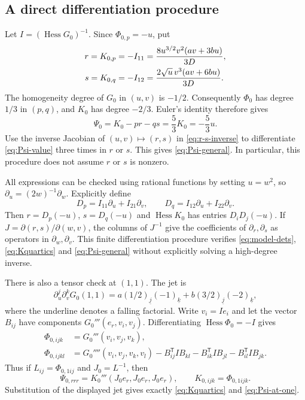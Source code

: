 \documentclass[11pt,a4paper]{article}
\numberwithin{equation}{section}
\theoremstyle{remark}
\DeclareMathOperator{\Hess}{Hess}
\begin{document}
\subsection{A direct differentiation procedure}
Let $I=(\Hess G_0)^{-1}$. Since $\Phi_{0,p}=-u$, put
\begin{align}
 r=K_{0,p}=-I_{11}
   &=\frac{8u^{3/2}v^2(av+3bu)}{3D},\notag\\
 s=K_{0,q}=-I_{12}
   &=\frac{2\sqrt u\,v^3(av+6bu)}{3D}.
                  \label{eq:r-s-inverse}
\end{align}
The homogeneity degree of $G_0$ in $(u,v)$ is $-1/2$. Consequently
$\Phi_0$ has degree $1/3$ in $(p,q)$, and $K_0$ has degree $-2/3$.
Euler's identity therefore gives
\begin{equation}\label{eq:Psi-value}
 \Psi_0=K_0-pr-qs=\frac53 K_0=-\frac53u.
\end{equation}
Use the inverse Jacobian of $(u,v)\mapsto(r,s)$ in
\eqref{eq:r-s-inverse} to differentiate \eqref{eq:Psi-value} three times
in $r$ or $s$. This gives \eqref{eq:Psi-general}. In particular, this
procedure does not assume $r$ or $s$ is nonzero.

All expressions can be checked using rational functions by setting
$u=w^2$, so $\partial_u=(2w)^{-1}\partial_w$. Explicitly define
\[
 D_p=I_{11}\partial_u+I_{21}\partial_v,\qquad
 D_q=I_{12}\partial_u+I_{22}\partial_v.
\]
Then $r=D_p(-u)$, $s=D_q(-u)$ and
$\Hess K_0$ has entries $D_iD_j(-u)$. If
$J=\partial(r,s)/\partial(w,v)$, the columns of $J^{-1}$ give the
coefficients of $\partial_r,\partial_s$ as operators in
$\partial_w,\partial_v$. This finite differentiation procedure verifies
\eqref{eq:model-dets}, \eqref{eq:Kquartics} and
\eqref{eq:Psi-general} without explicitly solving a high-degree inverse.

There is also a tensor check at $(1,1)$. The jet is
\[
 \partial_u^j\partial_v^kG_0(1,1)
   =a(1/2)_{\underline j}(-1)_{\underline k}
       +b(3/2)_{\underline j}(-2)_{\underline k},
\]
where the underline denotes a falling factorial. Write $v_i=Ie_i$ and
let the vector $B_{ij}$ have components $G_0'''(e_r,v_i,v_j)$. Differentiating
$\Hess\Phi_0=-I$ gives
\begin{align*}
 \Phi_{0,ijk}&=G_0'''(v_i,v_j,v_k),\\
 \Phi_{0,ijkl}&=G_0''''(v_i,v_j,v_k,v_l)
       -B_{ij}^{\mathsf T}IB_{kl}-B_{ik}^{\mathsf T}IB_{jl}
       -B_{il}^{\mathsf T}IB_{jk}.
\end{align*}
Thus if $L_{ij}=\Phi_{0,1ij}$ and $J_0=L^{-1}$, then
\[
 \Psi_{0,rrr}=K_0'''(J_0e_r,J_0e_r,J_0e_r),
 \qquad K_{0,ijk}=\Phi_{0,1ijk}.
\]
Substitution of the displayed jet gives exactly
\eqref{eq:Kquartics} and \eqref{eq:Psi-at-one}.
\end{document}
